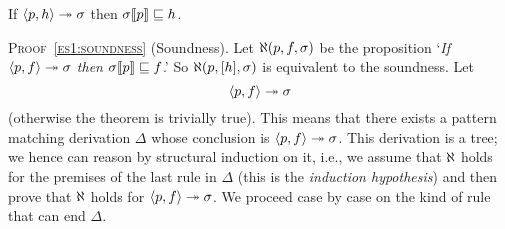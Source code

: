 
\begin{thm}[Soundness]\hfill
\label{es1:soundness}
\begin{center}
If \(\smat{h}{p} \twoheadrightarrow \sigma\) 
then \(\subst{p}{\sigma} \sqsubseteq h\).
\end{center}
\end{thm}

\noindent\textsc{Proof~\ref{es1:soundness}} (Soundness). Let
\(\ind{U}(p, f, \sigma)\) be the proposition `\emph{If}
\(\smj{f}{p}{\sigma}\) \emph{then} \(\subst{p}{\sigma} \sqsubseteq
f\).'  So \(\ind{U}(p, [h], \sigma)\) is equivalent to the
soundness. Let
\begin{equation}
  \smj{f}{p}{\sigma} \label{es1:sound:head}
\end{equation}
(otherwise the theorem is trivially true). This means that there
exists a pattern matching derivation \(\Delta\) whose conclusion is
\(\smj{f}{p}{\sigma}\). This derivation is a tree; we hence can reason
by structural induction on it, i.e., we assume that \(\ind{U}\) holds
for the premises of the last rule in \(\Delta\) (this is the
\emph{induction hypothesis}) and then prove that \(\ind{U}\) holds for
\(\smj{f}{p}{\sigma}\). We proceed case by case on the kind of rule
that can end \(\Delta\).
